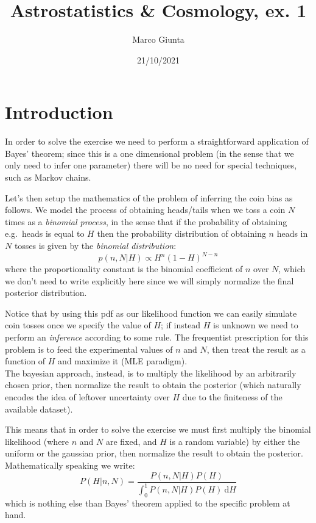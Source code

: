 \documentclass[
]{article}
\title{Astrostatistics \& Cosmology, ex. 1}
\author{Marco Giunta}
\date{21/10/2021}
\begin{document}
\maketitle

\hypertarget{introduction}{%
\section{Introduction}\label{introduction}}

In order to solve the exercise we need to perform a straightforward
application of Bayes' theorem; since this is a one dimensional problem
(in the sense that we only need to infer one parameter) there will be no
need for special techniques, such as Markov chains.

Let's then setup the mathematics of the problem of inferring the coin
bias as follows. We model the process of obtaining heads/tails when we
toss a coin \(N\) times as a \emph{binomial process}, in the sense that
if the probability of obtaining e.g.~heads is equal to \(H\) then the
probability distribution of obtaining \(n\) heads in \(N\) tosses is
given by the \emph{binomial distribution}: \begin{equation}
  p(n,N|H) \propto H^n (1-H)^{N-n}
\end{equation} where the proportionality constant is the binomial
coefficient of \(n\) over \(N\), which we don't need to write explicitly
here since we will simply normalize the final posterior distribution.

Notice that by using this pdf as our likelihood function we can easily
simulate coin tosses once we specify the value of \(H\); if instead
\(H\) is unknown we need to perform an \emph{inference} according to
some rule. The frequentist prescription for this problem is to feed the
experimental values of \(n\) and \(N\), then treat the result as a
function of \(H\) and maximize it (MLE paradigm).\\
The bayesian approach, instead, is to multiply the likelihood by an
arbitrarily chosen prior, then normalize the result to obtain the
posterior (which naturally encodes the idea of leftover uncertainty over
\(H\) due to the finiteness of the available dataset).

This means that in order to solve the exercise we must first multiply
the binomial likelihood (where \(n\) and \(N\) are fixed, and \(H\) is a
random variable) by either the uniform or the gaussian prior, then
normalize the result to obtain the posterior.\\
Mathematically speaking we write: \begin{equation}
  P(H|n,N) = \frac{P(n,N|H)P(H)}{\int_0^1 P(n,N|H)P(H) \ \mathrm{d}H}
\end{equation} which is nothing else than Bayes' theorem applied to the
specific problem at hand.
\end{document}
